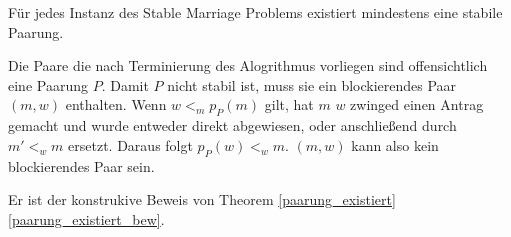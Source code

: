 \begin{Theorem}
\label{paarung_existiert}
  Für jedes Instanz des Stable Marriage Problems existiert mindestens eine stabile Paarung.
\end{Theorem}

\begin{Beweis}
\label{paarung_existiert_bew}
  Die Paare die nach Terminierung des Alogrithmus vorliegen sind offensichtlich eine Paarung $P$. Damit $P$ nicht stabil ist, muss sie ein blockierendes Paar $(m,w)$ enthalten. Wenn $w <_{m} p_{P}(m)$ gilt, hat $m$ $w$ zwinged einen Antrag gemacht und wurde entweder direkt abgewiesen, oder anschließend durch $m' <_{w} m$ ersetzt. Daraus folgt $p_{P}(w) <_{w} m$. $(m,w)$ kann also kein blockierendes Paar sein.
\end{Beweis}

Er ist der konstrukive Beweis von Theorem \ref{paarung_existiert} \ref{paarung_existiert_bew}.
